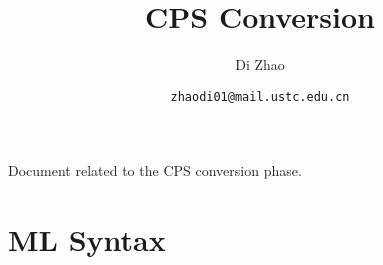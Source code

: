 \documentclass{article}
\theoremstyle{definition}
\theoremstyle{remark}
\numberwithin{equation}{section}
\begin{document}
\newcommand{\env}[1]{[\![#1]\!]\kappa}
\newcommand{\round}[1]{(\!|#1|\!)}

\title{CPS Conversion}%
\author{Di Zhao}%
\date{\small{\texttt{zhaodi01@mail.ustc.edu.cn}}}%

\maketitle

Document related to the CPS conversion phase.

\section{ML Syntax}
\end{document}
